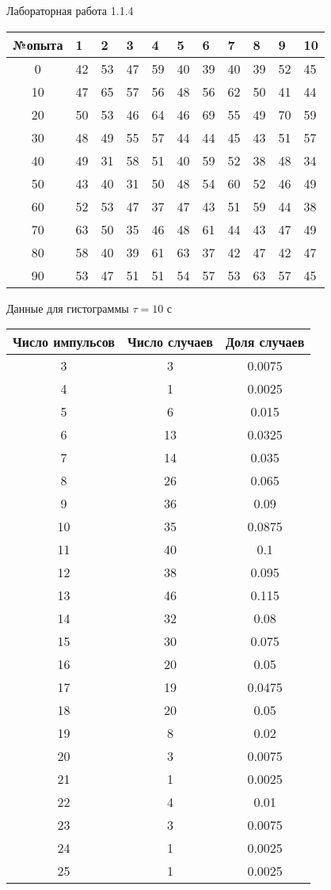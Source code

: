 \documentclass{astroedu-lab}
\begin{document}
\begin{problem}{\large Лабораторная работа 1.1.4}
\begin{center}
\begin{tabular}[t]{|c|l|l|l|l|l|l|l|l|l|l|}
\hline
№опыта & 1 & 2 & 3 & 4 & 5 & 6 & 7 & 8 & 9 & 10 \\
\hline
0 & 42 & 53 & 47 & 59 & 40 & 39 & 40 & 39 & 52 & 45 \\
10 & 47 & 65 & 57 & 56 & 48 & 56 & 62 & 50 & 41 & 44 \\
20 & 50 & 53 & 46 & 64 & 46 & 69 & 55 & 49 & 70 & 59 \\
30 & 48 & 49 & 55 & 57 & 44 & 44 & 45 & 43 & 51 & 57 \\
40 & 49 & 31 & 58 & 51 & 40 & 59 & 52 & 38 & 48 & 34 \\
50 & 43 & 40 & 31 & 50 & 48 & 54 & 60 & 52 & 46 & 49 \\
60 & 52 & 53 & 47 & 37 & 47 & 43 & 51 & 59 & 44 & 38 \\
70 & 63 & 50 & 35 & 46 & 48 & 61 & 44 & 43 & 47 & 49 \\
80 & 58 & 40 & 39 & 61 & 63 & 37 & 42 & 47 & 42 & 47 \\
90 & 53 & 47 & 51 & 51 & 54 & 57 & 53 & 63 & 57 & 45 \\
\hline
\end{tabular}
\end{center}

\begin{center}
Данные для гистограммы $\tau = 10$ с

\begin{tabular}[t]{|c|c|c|}
\hline
Число импульсов & Число случаев & Доля случаев \\
\hline
3 & 3 & 0.0075 \\
4 & 1 & 0.0025 \\
5 & 6 & 0.015 \\
6 & 13 & 0.0325 \\
7 & 14 & 0.035 \\
8 & 26 & 0.065 \\
9 & 36 & 0.09 \\
10 & 35 & 0.0875 \\
11 & 40 & 0.1 \\
12 & 38 & 0.095 \\
13 & 46 & 0.115 \\
14 & 32 & 0.08 \\
15 & 30 & 0.075 \\
16 & 20 & 0.05 \\
17 & 19 & 0.0475 \\
18 & 20 & 0.05 \\
19 & 8 & 0.02 \\
20 & 3 & 0.0075 \\
21 & 1 & 0.0025 \\
22 & 4 & 0.01 \\
23 & 3 & 0.0075 \\
24 & 1 & 0.0025 \\
25 & 1 & 0.0025 \\
\hline
\end{tabular}
\end{center}


\end{problem}
\end{document}
